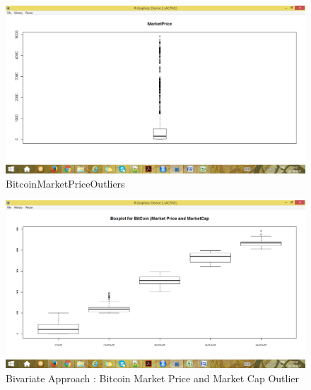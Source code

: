 \documentclass{article}
\begin{document}
\begin{figure}
    \centering
    \includegraphics[width=\linewidth]{bitcoin_price_marketprice_boxplot}
    \caption{Bitcoin\textunderscore Market\textunderscore Price\textunderscore Outliers}
    \label{fig:my_label}
\end{figure}



\begin{figure}
    \centering
    \includegraphics[width=\linewidth]{bitcoin_dataset_marketprice_cap_boxplot}
    \caption{Bivariate Approach : Bitcoin Market Price and Market Cap Outlier}
    \label{fig:my_label}
\end{figure}
\end{document}
